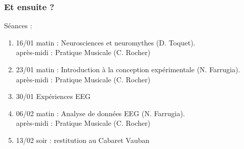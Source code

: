 \documentclass[xcolor=dvipsnames,english]{beamer}
\begin{document}
\begin{frame}
  \frametitle{Et ensuite ?}
  Séances : 
  \begin{enumerate}
  \item 16/01 matin : Neurosciences et neuromythes (D. Toquet).\\ après-midi : Pratique Musicale (C. Rocher)
  \item 23/01 matin : Introduction à la conception expérimentale (N. Farrugia). \\ après-midi : Pratique Musicale (C. Rocher)
  \item 30/01 Expériences EEG
  \item 06/02 matin : Analyse de données EEG (N. Farrugia). \\après-midi : Pratique Musicale (C. Rocher)
  \item 13/02 soir : restitution au Cabaret Vauban 
  \end{enumerate}
  \end{frame}
\end{document}
